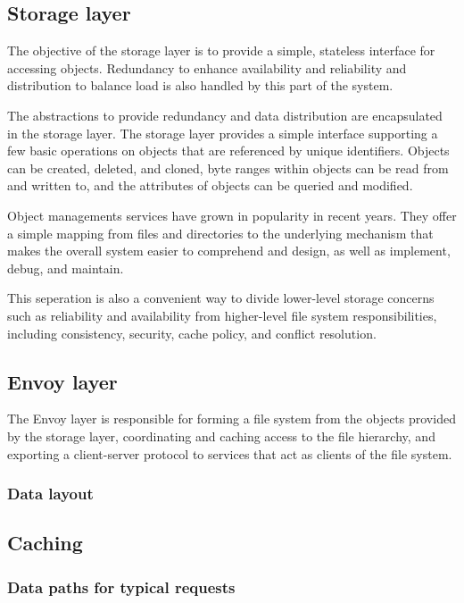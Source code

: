 \subsection{Storage layer}

The objective of the storage layer is to provide a simple, stateless interface for accessing objects. Redundancy to enhance availability and reliability and distribution to balance load is also handled by this part of the system.

The abstractions to provide redundancy and data distribution are encapsulated in the storage layer. The storage layer provides a simple interface supporting a few basic operations on objects that are referenced by unique identifiers. Objects can be created, deleted, and cloned, byte ranges within objects can be read from and written to, and the attributes of objects can be queried and modified.

Object managements services have grown in popularity in recent years. They offer a simple mapping from files and directories to the underlying mechanism that makes the overall system easier to comprehend and design, as well as implement, debug, and maintain.

This seperation is also a convenient way to divide lower-level storage concerns such as reliability and availability from higher-level file system responsibilities, including consistency, security, cache policy, and conflict resolution.

\subsection{Envoy layer}

The Envoy layer is responsible for forming a file system from the objects provided by the storage layer, coordinating and caching access to the file hierarchy, and exporting a client-server protocol to services that act as clients of the file system.



\subsubsection{Data layout}

\subsection{Caching}
\subsubsection{Data paths for typical requests}

